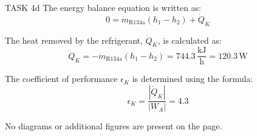 TASK 4d  
The energy balance equation is written as:  
\[
0 = \dot{m}_{\text{R134a}} (h_1 - h_2) + \dot{Q}_K
\]  

The heat removed by the refrigerant, \( \dot{Q}_K \), is calculated as:  
\[
\dot{Q}_K = -\dot{m}_{\text{R134a}} (h_1 - h_2) = 744.3 \, \frac{\text{kJ}}{\text{h}} = 120.3 \, \text{W}
\]  

The coefficient of performance \( \epsilon_K \) is determined using the formula:  
\[
\epsilon_K = \frac{|\dot{Q}_K|}{|W_A|} = 4.3
\]  

No diagrams or additional figures are present on the page.